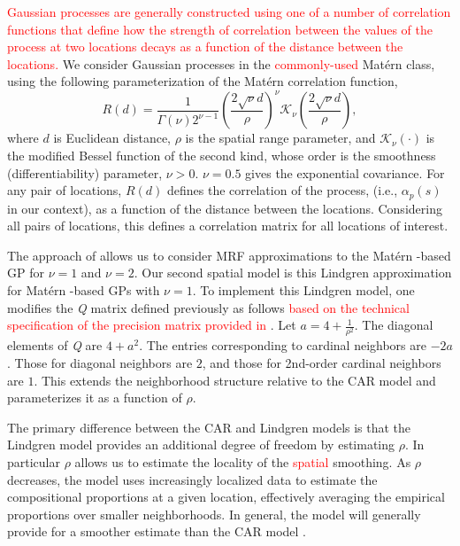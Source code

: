 \documentclass[10pt,letterpaper]{article}
\newcommand{\matern}{Mat\'{e}rn }
\begin{document}
\textcolor{red}{Gaussian processes are generally constructed using
one of a number of correlation functions that define how the strength
of correlation between the values of the process at two locations
decays as a function of the distance between the locations. }We consider
Gaussian processes in the \textcolor{red}{commonly-used} \matern
class, using the following parameterization of the \matern correlation
function, 
\begin{equation}
R(d)=\frac{1}{\Gamma(\nu)2^{\nu-1}}\left(\frac{2\sqrt{\nu}d}{\rho}\right)^{\nu}\mathcal{K}_{\nu}\left(\frac{2\sqrt{\nu}d}{\rho}\right),\label{eq:Matern}
\end{equation}
where $d$ is Euclidean distance, $\rho$ is the spatial range parameter,
and $\mathcal{K}_{\nu}(\cdot)$ is the modified Bessel function of
the second kind, whose order is the smoothness (differentiability)
parameter, $\nu>0$. $\nu=0.5$ gives the exponential covariance.
For any pair of locations, $R(d)$ defines the correlation of the
process, (i.e., $\alpha_{p}(s)$ in our context), as a function of
the distance between the locations. Considering all pairs of locations,
this defines a correlation matrix for all locations of interest. 

The approach of \cite{Lind:etal:2011} allows us to consider MRF
approximations to the \matern-based GP for $\nu=1$ and $\nu=2$.
Our second spatial model is this Lindgren approximation for \matern-based
GPs with $\nu=1$. To implement this Lindgren model, one modifies
the \emph{Q} matrix defined previously as follows \textcolor{red}{based
on the technical specification of the precision matrix provided in
\cite{Lind:etal:2011}}. Let $a=4+\frac{1}{\rho^{2}}$. The diagonal
elements of \emph{Q} are $4+a^{2}$. The entries corresponding to cardinal
neighbors are $-2a$. Those for diagonal neighbors are $2$, and those
for 2nd-order cardinal neighbors are $1$. This extends the neighborhood
structure relative to the CAR model and parameterizes it as a function
of $\rho$.

The primary difference between the CAR and Lindgren models is that
the Lindgren model provides an additional degree of freedom by estimating
$\rho$. In particular $\rho$ allows us to estimate the locality
of the \textcolor{red}{spatial} smoothing. As $\rho$ decreases, the
model uses increasingly localized data to estimate the compositional
proportions at a given location, effectively averaging the empirical
proportions over smaller neighborhoods. In general, the \cite{Lind:etal:2011}
model will generally provide for a smoother estimate than the CAR
model \cite{Paci:2013}. 
\end{document}
